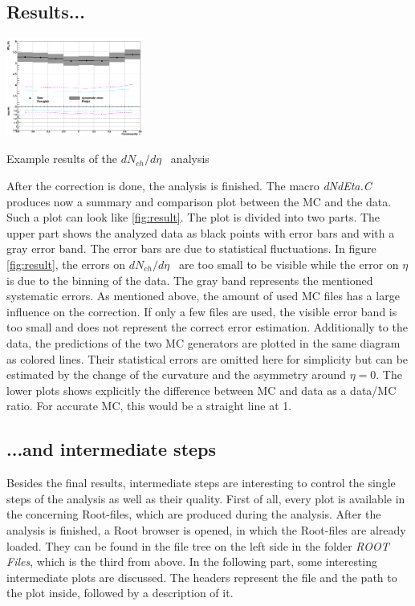 \documentclass{article}
\newcommand\dNdEta{$dN_{ch}/d\eta$}
\begin{document}
\subsection{Results...}
\label{subsec:results}
\begin{floatingfigure}[r]{55mm}
\centering
\includegraphics[width=45mm, natwidth=796, natheight=574]{images/dNdEta.png}
\caption{Example results of the \dNdEta~ analysis}
\label{fig:result}
\end{floatingfigure}
After the correction is done, the analysis is finished. The macro \textit{dNdEta.C} produces now a summary and comparison plot between the MC and the data. Such a plot can look like \ref{fig:result}. The plot is divided into two parts. The upper part shows the analyzed data as black points with error bars and with a gray error band. The error bars are due to statistical fluctuations. In figure \ref{fig:result}, the errors on \dNdEta~ are too small to be visible while the error on $\eta$ is due to the binning of the data. The gray band represents the mentioned systematic errors. As mentioned above, the amount of used MC files has a large influence on the correction. If only a few files are used, the visible error band is too small and does not represent the correct error estimation. Additionally to the data, the predictions of the two MC generators are plotted in the same diagram as colored lines. Their statistical errors are omitted here for simplicity but can be estimated by the change of the curvature and the asymmetry around $\eta = 0$. The lower plots shows explicitly the difference between MC and data as a data/MC ratio. For accurate MC, this would be a straight line at 1.\\

\subsection{...and intermediate steps}
\label{subsec:intermediate}
Besides the final results, intermediate steps are interesting to control the single steps of the analysis as well as their quality. First of all, every plot is available in the concerning Root-files, which are produced during the analysis. After the analysis is finished, a Root browser is opened, in which the Root-files are already loaded. They can be found in the file tree on the left side in the folder \textit{ROOT Files}, which is the third from above. In the following part, some interesting intermediate plots are discussed. The headers represent the file and the path to the plot inside, followed by a description of it.
\end{document}
